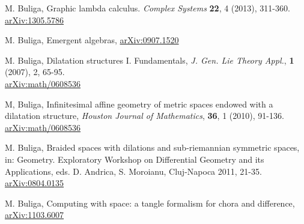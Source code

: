 \documentclass{article}
\begin{document}






 














%


\begin{thebibliography}{99}


 M. Buliga, Graphic lambda calculus. {\it Complex Systems} {\bf 22}, 4 (2013), 311-360. \\ 
\href{https://arxiv.org/abs/1305.5786}{arXiv:1305.5786}

 M. Buliga, Emergent algebras, \href{https://arxiv.org/abs/0907.1520}{arXiv:0907.1520}

 M. Buliga, Dilatation structures I. Fundamentals, {\it 
J. Gen. Lie Theory Appl.},  {\bf 1} (2007),  2, 65-95. \\ 
\href{https://arxiv.org/abs/math/0608536}{arXiv:math/0608536}


 M, Buliga, Infinitesimal affine geometry of metric spaces endowed with a dilatation structure, {\it Houston Journal of Mathematics}, {\bf 36}, 1 (2010), 91-136. \\ 
\href{https://arxiv.org/abs/0804.0135}{arXiv:math/0608536}


 M. Buliga, Braided spaces with dilations and sub-riemannian symmetric spaces, in: Geometry. Exploratory Workshop on Differential Geometry and its Applications, eds. D. Andrica, S. Moroianu, Cluj-Napoca 2011, 21-35. \\   
\href{https://arxiv.org/abs/1005.5031}{arXiv:0804.0135}


 M. Buliga, Computing with space: a tangle formalism for chora and difference, \href{https://arxiv.org/abs/1103.6007}{arXiv:1103.6007}






\end{thebibliography}
\end{document}
